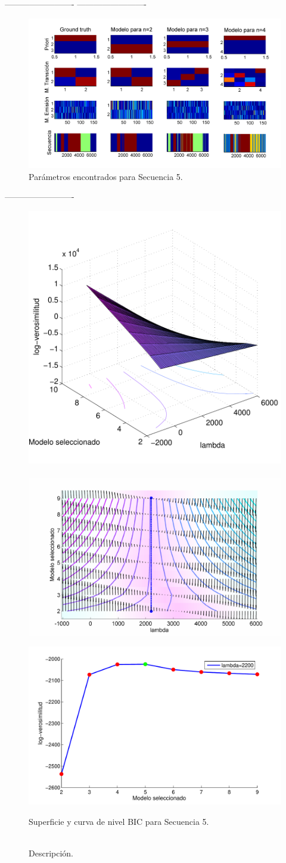 -------------------------
-------------------------

\begin{figure}[H]
  \centerline
  {\includegraphics[width=1.3\linewidth]{gfx/chap6/cald1}} \quad
  \caption{Parámetros encontrados para Secuencia 5.}
  \label{fig:prb1_par}
\end{figure}

-------------------------

\begin{figure}[H]
  \centerline  
  {\includegraphics[width=0.55\linewidth]{gfx/chap6/caldbic1} ~
   \includegraphics[width=0.5\linewidth]{gfx/chap6/caldbic2} }
  \centerline  
  {\includegraphics[width=0.4\linewidth]{gfx/chap6/caldbic3}
  } \quad
  \caption{Superficie y curva de nivel BIC para Secuencia 5.}
  \caption*{\\Descripción.}
  \label{fig:prb1_sup}
\end{figure}


